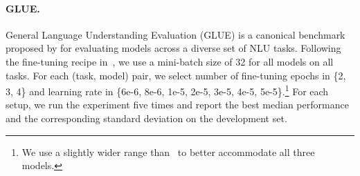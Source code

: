 \documentclass[11pt,a4paper]{article}
\begin{document}
\paragraph{GLUE.}
General Language Understanding Evaluation (GLUE) is a canonical benchmark proposed by \citet{Wang-2018-glue} for evaluating models across a diverse set of NLU tasks. Following the fine-tuning recipe in~\citet{Devlin-2019-bert}, we use a mini-batch size of 32 for all models on all tasks. For each (task, model) pair, we select number of fine-tuning epochs in \{2, 3, 4\} and learning rate in \{6e-6, 8e-6, 1e-5, 2e-5, 3e-5, 4e-5, 5e-5\}.\footnote{We use a slightly wider range than~\citet{Devlin-2019-bert} to better accommodate all three models.} For each setup, we run the experiment five times and report the best median performance and the corresponding standard deviation on the development set.
\end{document}
